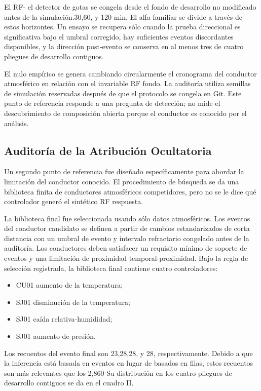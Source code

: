 \documentclass{ieeeaccess}
\providecommand{\tightlist}{\setlength{\itemsep}{0pt}\setlength{\parskip}{0pt}}
\begin{document}
El RF- el detector de gotas se congela desde el fondo de desarrollo no modificado antes de la simulación.30,60, y 120 min. El alfa familiar se divide a través de estos horizontes. Un ensayo se recupera sólo cuando la prueba direccional es significativa bajo el umbral corregido, hay suficientes eventos discordantes disponibles, y la dirección post-evento se conserva en al menos tres de cuatro pliegues de desarrollo contiguos.

El nulo empírico se genera cambiando circularmente el cronograma del conductor atmosférico en relación con el invariable RF fondo. La auditoría utiliza semillas de simulación reservadas después de que el protocolo se congela en Git. Este punto de referencia responde a una pregunta de detección; no mide el descubrimiento de composición abierta porque el conductor es conocido por el análisis.

\subsection{Auditoría de la Atribución Ocultatoria}\label{auditoruxeda-de-la-atribuciuxf3n-ocultatoria}

Un segundo punto de referencia fue diseñado específicamente para abordar la limitación del conductor conocido. El procedimiento de búsqueda se da una biblioteca finita de conductores atmosféricos competidores, pero no se le dice qué controlador generó el sintético RF respuesta.

La biblioteca final fue seleccionada usando sólo datos atmosféricos. Los eventos del conductor candidato se definen a partir de cambios estandarizados de corta distancia con un umbral de evento y intervalo refractario congelado antes de la auditoría. Los conductores deben satisfacer un requisito mínimo de soporte de eventos y una limitación de proximidad temporal-proximidad. Bajo la regla de selección registrada, la biblioteca final contiene cuatro controladores:

\begin{itemize}
\tightlist
\item
  CU01 aumento de la temperatura;
\item
  SJ01 disminución de la temperatura;
\item
  SJ01 caída relativa-humididad;
\item
  SJ01 aumento de presión.
\end{itemize}

Los recuentos del evento final son 23,28,28, y 28, respectivamente. Debido a que la inferencia está basada en eventos en lugar de basados en filas, estos recuentos son más relevantes que los 2,860 Su distribución en los cuatro pliegues de desarrollo contiguos se da en el cuadro II.
\end{document}
